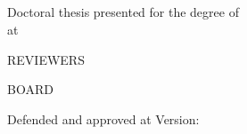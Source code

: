 \begin{titlepage}
    \begin{addmargin}[-1cm]{-3cm}
        \begin{center}
            \large

            \hfill

            \vfill
            \spacedlowsmallcaps{\myAuthor} \\ \bigskip
            \begingroup
                \color{Maroon}\spacedallcaps{\myTitle} \\ \bigskip
            \endgroup
            \vfill
            \mySubtitle{} \\ \bigskip

            \vfill

            \def\svgwidth{.5\textwidth}
             \\ \medskip


            \vfill{}
        \end{center}

        \noindent
        Doctoral thesis presented for the degree of\\
        \myDegree{} at

        \medskip{}

        \noindent
        \myInstitute{}\bigskip

        \vfill

        \noindent
        REVIEWERS\\
        \myReviewers{}\bigskip

        \noindent
        BOARD\\
        \myBoard{}\bigskip

        \noindent
	    \ifdefined \thedefense
	    Defended and approved at \thedefense
	    \else
	    Version: \myVersion
	    \fi

    \end{addmargin}
\end{titlepage}
